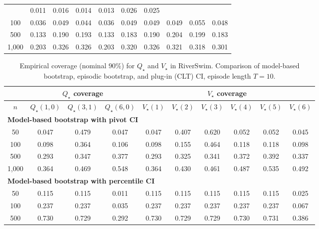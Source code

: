 \documentclass{article}
\numberwithin{equation}{section}
\begin{document}
\begin{table}[ht]
\begin{tabular}{c|ccc|cccccc}
& 0.011 & 0.016 & 0.014 & 0.013 & 0.026 & 0.025 \\
100
& 0.036 & 0.049 & 0.044
& 0.036 & 0.049 & 0.049 & 0.049 & 0.055 & 0.048 \\
500
& 0.133 & 0.190 & 0.193
& 0.133 & 0.183 & 0.190 & 0.204 & 0.199 & 0.183 \\
1{,}000
& 0.203 & \cellcolor{covheat!13!white}0.326 & \cellcolor{covheat!13!white}0.326
& 0.203 & \cellcolor{covheat!10!white}0.320 & \cellcolor{covheat!13!white}0.326 & \cellcolor{covheat!11!white}0.321 & \cellcolor{covheat!9!white}0.318 & \cellcolor{covheat!1!white}0.301 \\
\hline
\end{tabular}
\end{table}

\begin{table}[ht]
\centering
\caption{Empirical coverage (nominal $90\%$) for $Q_\star$ and $V_\star$ in RiverSwim. Comparison of model-based bootstrap, episodic bootstrap, and plug-in (CLT) CI, episode length $T=10$.}
\label{tab:riverswim-optimal-coverage-T10-90}
\begin{tabular}{c|ccc|cccccc}
\hline
& \multicolumn{3}{c|}{$Q_\star$ coverage} & \multicolumn{6}{c}{$V_\star$ coverage} \\ \hline
$n$
& $Q_\star(1,0)$ & $Q_\star(3,1)$ & $Q_\star(6,0)$
& $V_\star(1)$ & $V_\star(2)$ & $V_\star(3)$ & $V_\star(4)$ & $V_\star(5)$ & $V_\star(6)$ \\
\hline
\multicolumn{10}{l}{\textbf{Model-based bootstrap with pivot CI}} \\ \hline
50
& 0.047 & 0.479 & 0.047
& 0.047 & 0.407 & 0.620 & 0.052 & 0.052 & 0.045 \\
100
& 0.098 & 0.364 & 0.106
& 0.098 & 0.155 & 0.464 & 0.118 & 0.118 & 0.098 \\
500
& 0.293 & 0.347 & 0.377
& 0.293 & 0.325 & 0.341 & 0.372 & 0.392 & 0.337 \\
1{,}000
& 0.364 & 0.469 & 0.548
& 0.364 & 0.430 & 0.461 & 0.487 & 0.535 & 0.492 \\
\hline
\multicolumn{10}{l}{\textbf{Model-based bootstrap with percentile CI}} \\ \hline
50
& 0.115 & 0.115 & 0.011
& 0.115 & 0.115 & 0.115 & 0.115 & 0.115 & 0.025 \\
100
& 0.237 & 0.237 & 0.035
& 0.237 & 0.237 & 0.237 & 0.237 & 0.237 & 0.067 \\
500
& \cellcolor{covheat!15!white}0.730 & \cellcolor{covheat!15!white}0.729 & 0.292
& \cellcolor{covheat!15!white}0.730 & \cellcolor{covheat!15!white}0.729 & \cellcolor{covheat!15!white}0.729 & \cellcolor{covheat!15!white}0.730 & \cellcolor{covheat!16!white}0.731 & 0.386 \\

\end{tabular}
\end{table}
\end{document}
